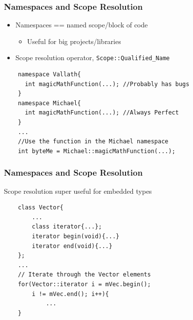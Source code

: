 \documentclass{beamer}
\begin{document}
\begin{frame}[fragile]
    \frametitle{Namespaces and Scope Resolution}
    \begin{itemize}
    \item Namespaces == named scope/block of code
        \begin{itemize}
        \item Useful for big projects/libraries
        \end{itemize}
    \item Scope resolution operator, \texttt{Scope::Qualified\_Name}
    \end{itemize}
    \begin{verbatim}
    namespace Vallath{ 
      int magicMathFunction(...); //Probably has bugs 
    }
    namespace Michael{ 
      int magicMathFunction(...); //Always Perfect 
    }
    ...
    //Use the function in the Michael namespace
    int byteMe = Michael::magicMathFunction(...);
    \end{verbatim}
\end{frame}
\begin{frame}[fragile]
    \frametitle{Namespaces and Scope Resolution}
    Scope resolution super useful for embedded types
    \begin{verbatim}
    class Vector{
        ...
        class iterator{...};
        iterator begin(void){...}
        iterator end(void){...}
    };
    ...
    // Iterate through the Vector elements
    for(Vector::iterator i = mVec.begin();
        i != mVec.end(); i++){
            ...
    }
    \end{verbatim}
\end{frame}
\end{document}

